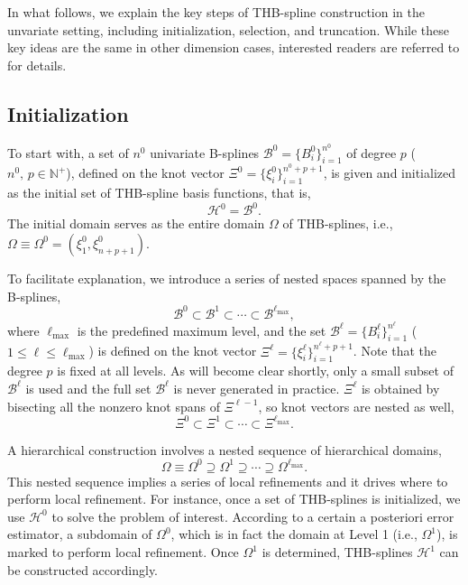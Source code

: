 \documentclass[graybox]{svmult}
\begin{document}
In what follows, we explain the key steps of THB-spline construction in the unvariate setting, including initialization, selection, and truncation. While these key ideas are the same in other dimension cases, interested readers are referred to \cite{ref:giannelli12, ref:lyche18} for details.

\subsection{Initialization}

To start with, a set of $n^0$ univariate B-splines $\mathcal{B}^0=\{B_i^0\}_{i=1}^{n^0}$ of degree $p$ ($n^0,\,p\in\mathbb{N}^{+}$), defined on the knot vector $\Xi^0 = \{\xi_i^0\}_{i=1}^{n^0+p+1}$, is given and initialized as the initial set of THB-spline basis functions, that is,
\begin{equation}
\mathcal{H}^0 = \mathcal{B}^0 .
\end{equation}
The initial domain serves as the entire domain $\Omega$ of THB-splines, i.e., $\Omega\equiv \Omega^0 = (\xi_1^0,\xi_{n+p+1}^0)$. 

To facilitate explanation, we introduce a series of nested spaces spanned by the B-splines,
\begin{equation}
\mathcal{B}^0 \subset \mathcal{B}^1 \subset \cdots \subset \mathcal{B}^{\ell_{\max}},	
\label{eq:nested_bsp}
\end{equation}
where $\ell_{\max}$ is the predefined maximum level, and the set $\mathcal{B}^{\ell}= \{B_i^\ell\}_{i=1}^{n^\ell}$ ($1\leq\ell\leq \ell_{\max}$) is defined on the knot vector $\Xi^\ell = \{\xi_i^\ell\}_{i=1}^{n^\ell+p+1}$. Note that the degree $p$ is fixed at all levels. As will become clear shortly, only a small subset of $\mathcal{B}^\ell$ is used and the full set $\mathcal{B}^\ell$ is never generated in practice. $\Xi^\ell$ is obtained by bisecting all the nonzero knot spans of $\Xi^{\ell-1}$, so knot vectors are nested as well,
\begin{equation}
\Xi^0 \subset \Xi^1 \subset \cdots \subset \Xi^{\ell_{\max}}.
\end{equation}

A hierarchical construction involves a nested sequence of hierarchical domains,
\begin{equation}
\Omega \equiv \Omega^0 \supseteq \Omega^1 \supseteq \cdots \supseteq \Omega^{\ell_{\max}}.
\label{eq:thb_nested_domain}
\end{equation}
This nested sequence implies a series of local refinements and it drives where to perform local refinement. For instance, once a set of THB-splines is initialized, we use $\mathcal{H}^0$ to solve the problem of interest. According to a certain a posteriori error estimator, a subdomain of $\Omega^0$, which is in fact the domain at Level 1 (i.e., $\Omega^1$), is marked to perform local refinement. Once $\Omega^1$ is determined, THB-splines $\mathcal{H}^1$ can be constructed accordingly. 
\end{document}

